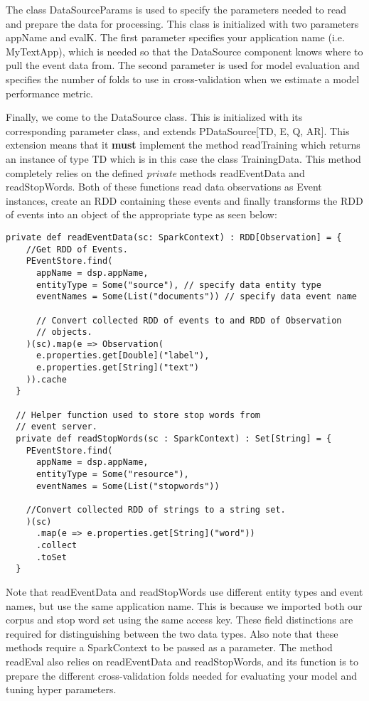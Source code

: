 \documentclass[a4paper,12pt]{article}
\renewcommand{\bf}[1]{\textbf{#1}}
\renewcommand{\it}[1]{\textit{#1}}
\newcommand{\3}{\left}
\newcommand{\4}{\right}
\renewcommand{\-}[1]{{}^{-#1}}
\begin{document}
The class DataSourceParams is used to specify the parameters needed to read and prepare the data for processing. This class is initialized with two parameters appName and evalK. The first parameter specifies your application name (i.e. MyTextApp), which is needed so that the DataSource component knows where to pull the event data from. The second parameter is used for model evaluation and specifies the number of folds to use in cross-validation 
when we estimate a model performance metric.

Finally, we come to the DataSource class. This is initialized with its corresponding parameter class, and extends PDataSource[TD, E, Q, AR]. This extension means that it \bf{must} implement the method readTraining which returns an instance of type TD which is in this case the class TrainingData. This method completely relies on the defined \it{private} methods readEventData and readStopWords. Both of these functions read data observations as Event instances, create an RDD containing these events and finally transforms the RDD of events into an object of the appropriate type as seen below:

\begin{verbatim}
private def readEventData(sc: SparkContext) : RDD[Observation] = {
    //Get RDD of Events.
    PEventStore.find(
      appName = dsp.appName,
      entityType = Some("source"), // specify data entity type
      eventNames = Some(List("documents")) // specify data event name

      // Convert collected RDD of events to and RDD of Observation
      // objects.
    )(sc).map(e => Observation(
      e.properties.get[Double]("label"),
      e.properties.get[String]("text")
    )).cache
  }

  // Helper function used to store stop words from
  // event server.
  private def readStopWords(sc : SparkContext) : Set[String] = {
    PEventStore.find(
      appName = dsp.appName,
      entityType = Some("resource"),
      eventNames = Some(List("stopwords"))

    //Convert collected RDD of strings to a string set.
    )(sc)
      .map(e => e.properties.get[String]("word"))
      .collect
      .toSet
  }
\end{verbatim}

Note that readEventData and readStopWords use different entity types and event names, but use the same application name. This is because we imported both our corpus and stop word set using the same access key. These field distinctions are required for distinguishing between the two data types. Also note that these methods require a SparkContext to be passed as a parameter. The method readEval also relies on readEventData and readStopWords, and its function is to prepare the different cross-validation folds needed for evaluating your model and tuning hyper parameters. 
\end{document}
